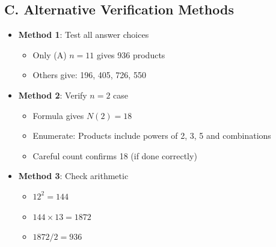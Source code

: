 \documentclass[12pt]{article}
\begin{document}
\begin{verificationbox}
\subsection*{C. Alternative Verification Methods}
\begin{itemize}[leftmargin=*]
    \item \textbf{Method 1}: Test all answer choices
    \begin{itemize}
        \item Only (A) $n=11$ gives 936 products
        \item Others give: 196, 405, 726, 550
    \end{itemize}
    \item \textbf{Method 2}: Verify $n=2$ case
    \begin{itemize}
        \item Formula gives $N(2) = 18$
        \item Enumerate: Products include powers of 2, 3, 5 and combinations
        \item Careful count confirms 18 (if done correctly)
    \end{itemize}
    \item \textbf{Method 3}: Check arithmetic
    \begin{itemize}
        \item $12^2 = 144$ \checkmark
        \item $144 \times 13 = 1872$ \checkmark
        \item $1872 / 2 = 936$ \checkmark
    \end{itemize}
\end{itemize}
\end{verificationbox}
\end{document}
